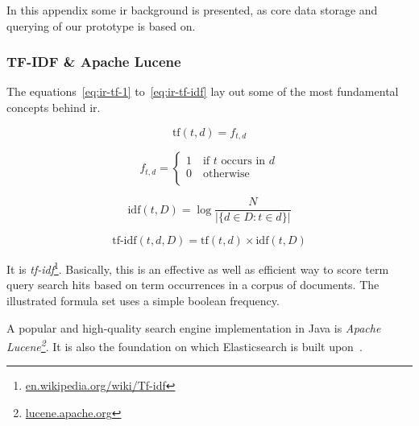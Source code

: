 In this appendix some \gls{ir} background is presented, as core data storage and querying of our prototype is based on.

\subsubsection{TF-IDF \& Apache Lucene}

The equations~\ref{eq:ir-tf-1} to~\ref{eq:ir-tf-idf} lay out some of the most fundamental concepts behind \gls{ir}.

\begin{equation}
\text{tf}(t, d) = f_{t,d}
\label{eq:ir-tf-1}
\end{equation}

\begin{equation}
f_{t,d} =
\begin{cases}
  1 \quad \text{if } t \text{ occurs in } d \\
  0 \quad \text{otherwise} \\
\end{cases}
\label{eq:ir-tf-2}
\end{equation}

\begin{equation}
\text{idf}(t, D) = \log\frac{N}{|\{d \in D : t \in d\}|}
\label{eq:ir-idf}
\end{equation}

\begin{equation}
\text{tf-idf}(t, d, D) = \text{tf}(t, d) \times \text{idf}(t, D)
\label{eq:ir-tf-idf}
\end{equation}

It is \emph{\gls{tf-idf}}\footnote{\textcolor{blue}{\href{https://en.wikipedia.org/wiki/Tf-idf}{en.wikipedia.org/wiki/Tf-idf}}}.
Basically, this is an effective as well as efficient way to score term query search hits based on term occurrences in a corpus of documents.
The illustrated formula set uses a simple boolean frequency.

A popular and high-quality search engine implementation in Java is \emph{Apache Lucene\footnote{\textcolor{blue}{\href{https://lucene.apache.org/}{lucene.apache.org}}}}.
It is also the foundation on which Elasticsearch is built upon~\cite{Gormley2015}.
